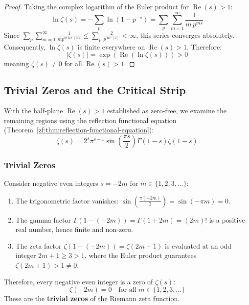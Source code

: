 \documentclass[a4paper]{article}
\begin{document}
\begin{proof}
Taking the complex logarithm of the Euler product for $\operatorname{Re}(s) > 1$:
\begin{equation*}
    \ln \zeta(s) = - \sum_{p} \ln(1 - p^{-s}) = \sum_{p} \sum_{m=1}^{\infty} \frac{1}{m \, p^{ms}}
\end{equation*}
Since $\sum_{p} \sum_{m=1}^\infty \frac{1}{m p^{m \operatorname{Re}(s)}} \le \sum_{p} \frac{2}{p^{\operatorname{Re}(s)}} < \infty$, this series converges absolutely. Consequently, $\ln \zeta(s)$ is finite everywhere on $\operatorname{Re}(s) > 1$. Therefore:
\begin{equation*}
    |\zeta(s)| = \exp(\operatorname{Re}(\ln \zeta(s))) > 0
\end{equation*}
meaning $\zeta(s) \ne 0$ for all $\operatorname{Re}(s) > 1$.
\end{proof}

\subsection{Trivial Zeros and the Critical Strip}\label{zf:subsec:trivial-zeros}

With the half-plane $\operatorname{Re}(s) > 1$ established as zero-free, we examine the remaining regions using the reflection functional equation (Theorem~\ref{zf:thm:reflection-functional-equation}):
\begin{equation}
    \label{zf:eq:reflection-functional}
    \zeta(s) = 2^s \pi^{s-1} \sin\left(\frac{\pi s}{2}\right) \Gamma(1-s) \zeta(1-s)
\end{equation}

\subsubsection{Trivial Zeros}
Consider negative even integers $s = -2m$ for $m \in \{1, 2, 3, \dots\}$:
\begin{enumerate}[label=(\roman*)]
    \item The trigonometric factor vanishes: $\sin\left(\frac{\pi (-2m)}{2}\right) = \sin(-\pi m) = 0$.
    \item The gamma factor $\Gamma(1 - (-2m)) = \Gamma(1 + 2m) = (2m)!$ is a positive real number, hence finite and non-zero.
    \item The zeta factor $\zeta(1 - (-2m)) = \zeta(2m + 1)$ is evaluated at an odd integer $2m+1 \ge 3 > 1$, where the Euler product guarantees $\zeta(2m+1) > 1 \ne 0$.
\end{enumerate}
Therefore, every negative even integer is a zero of $\zeta(s)$:
\begin{equation}
    \label{zf:eq:trivial-zeros}
    \boxed{\zeta(-2m) = 0 \quad \text{for all } m \in \{1, 2, 3, \dots\}}
\end{equation}
These are the \textbf{trivial zeros} of the Riemann zeta function.
\end{document}
